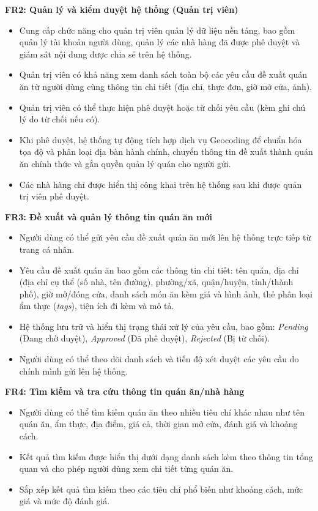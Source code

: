 \textbf{FR2: Quản lý và kiểm duyệt hệ thống (Quản trị viên)}
\begin{itemize}[label=\textbullet]
    \item Cung cấp chức năng cho quản trị viên quản lý dữ liệu nền tảng, bao gồm quản lý tài khoản người dùng,
    quản lý các nhà hàng đã được phê duyệt và giám sát nội dung được chia sẻ trên hệ thống.
    \item Quản trị viên có khả năng xem danh sách toàn bộ các yêu cầu đề xuất quán ăn từ người dùng cùng thông tin chi tiết (địa chỉ, thực đơn, giờ mở cửa, ảnh).
    \item Quản trị viên có thể thực hiện phê duyệt hoặc từ chối yêu cầu (kèm ghi chú lý do từ chối nếu có).
    \item Khi phê duyệt, hệ thống tự động tích hợp dịch vụ Geocoding để chuẩn hóa tọa độ và phân loại địa bàn hành chính, chuyển thông tin đề xuất thành quán ăn chính thức và gắn quyền quản lý quán cho người gửi.
    \item Các nhà hàng chỉ được hiển thị công khai trên hệ thống sau khi được quản trị viên phê duyệt.
\end{itemize}

\textbf{FR3: Đề xuất và quản lý thông tin quán ăn mới}
\begin{itemize}[label=\textbullet]
    \item Người dùng có thể gửi yêu cầu đề xuất quán ăn mới lên hệ thống trực tiếp từ trang cá nhân.
    \item Yêu cầu đề xuất quán ăn bao gồm các thông tin chi tiết: tên quán, địa chỉ (địa chỉ cụ thể (số nhà, tên đường), phường/xã, quận/huyện, tỉnh/thành phố), giờ mở/đóng cửa, danh sách món ăn kèm giá và hình ảnh, thẻ phân loại ẩm thực (\textit{tags}), tiện ích đi kèm và mô tả.
    \item Hệ thống lưu trữ và hiển thị trạng thái xử lý của yêu cầu, bao gồm: \textit{Pending} (Đang chờ duyệt), \textit{Approved} (Đã phê duyệt), \textit{Rejected} (Bị từ chối).
    \item Người dùng có thể theo dõi danh sách và tiến độ xét duyệt các yêu cầu do chính mình gửi lên hệ thống.
\end{itemize}

\textbf{FR4: Tìm kiếm và tra cứu thông tin quán ăn/nhà hàng} 
\begin{itemize}[label=\textbullet]
    \item Người dùng có thể tìm kiếm quán ăn theo nhiều tiêu chí khác nhau như tên
quán ăn, ẩm thực, địa điểm, giá cả, thời gian mở cửa, đánh giá và khoảng cách.
    \item Kết quả tìm kiếm được hiển thị dưới dạng danh sách kèm theo 
    thông tin tổng quan và cho phép người dùng xem chi tiết từng quán ăn.
    \item Sắp xếp kết quả tìm kiếm theo các tiêu chí 
    phổ biến như khoảng cách, mức giá và mức độ đánh giá.
\end{itemize}

